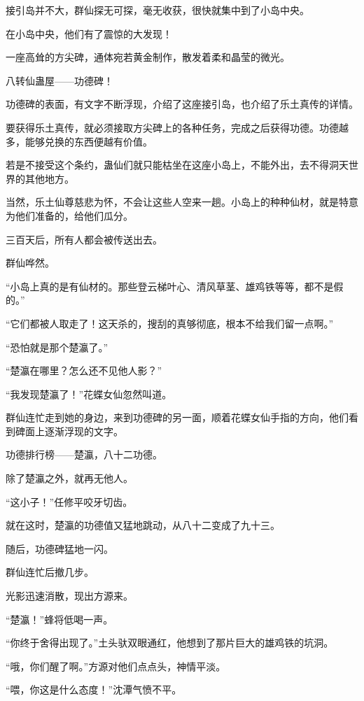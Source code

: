
\begin{this_body}

接引岛并不大，群仙探无可探，毫无收获，很快就集中到了小岛中央。

在小岛中央，他们有了震惊的大发现！

一座高耸的方尖碑，通体宛若黄金制作，散发着柔和晶莹的微光。

八转仙蛊屋——功德碑！

功德碑的表面，有文字不断浮现，介绍了这座接引岛，也介绍了乐土真传的详情。

要获得乐土真传，就必须接取方尖碑上的各种任务，完成之后获得功德。功德越多，能够兑换的东西便越有价值。

若是不接受这个条约，蛊仙们就只能枯坐在这座小岛上，不能外出，去不得洞天世界的其他地方。

当然，乐土仙尊慈悲为怀，不会让这些人空来一趟。小岛上的种种仙材，就是特意为他们准备的，给他们瓜分。

三百天后，所有人都会被传送出去。

群仙哗然。

“小岛上真的是有仙材的。那些登云梯叶心、清风草茎、雄鸡铁等等，都不是假的。”

“它们都被人取走了！这天杀的，搜刮的真够彻底，根本不给我们留一点啊。”

“恐怕就是那个楚瀛了。”

“楚瀛在哪里？怎么还不见他人影？”

“我发现楚瀛了！”花蝶女仙忽然叫道。

群仙连忙走到她的身边，来到功德碑的另一面，顺着花蝶女仙手指的方向，他们看到碑面上逐渐浮现的文字。

功德排行榜——楚瀛，八十二功德。

除了楚瀛之外，就再无他人。

“这小子！”任修平咬牙切齿。

就在这时，楚瀛的功德值又猛地跳动，从八十二变成了九十三。

随后，功德碑猛地一闪。

群仙连忙后撤几步。

光影迅速消散，现出方源来。

“楚瀛！”蜂将低喝一声。

“你终于舍得出现了。”土头驮双眼通红，他想到了那片巨大的雄鸡铁的坑洞。

“哦，你们醒了啊。”方源对他们点点头，神情平淡。

“喂，你这是什么态度！”沈潭气愤不平。


\end{this_body}
